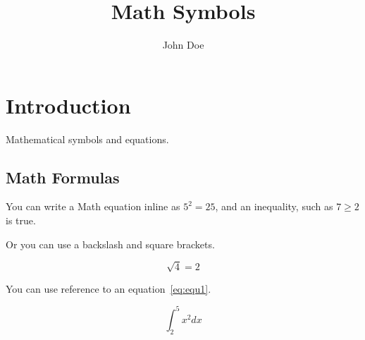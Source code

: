 \documentclass{article}
\title{Math Symbols}
\author{John Doe}
\date{}
\begin{document}
\maketitle

\section{Introduction}
Mathematical symbols and equations.

\subsection{Math Formulas}

You can write a Math equation inline as $5^2=25$, and an inequality, such as $7\geq 2$ is true.

Or you can use a backslash and square brackets.

\[\sqrt{4}=2\]

You can use reference to an equation~\ref{eq:equ1}.

\begin{equation}
	\int_2^5 x^2 dx
	\label{eq:equ1}
\end{equation}
\end{document}
